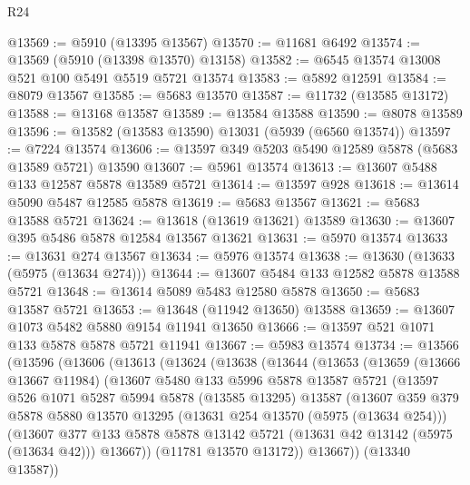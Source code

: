 \begin{lexlean}{R24}
\begin{coremodule}
@13569 := @5910 (@13395 @13567)
@13570 := @11681 @6492
@13574 := @13569 (@5910 (@13398 @13570) @13158)
@13582 := @6545 @13574 @13008 @521 @100 @5491 @5519 @5721 @13574
@13583 := @5892 @12591
@13584 := @8079 @13567
@13585 := @5683 @13570
@13587 := @11732 (@13585 @13172)
@13588 := @13168 @13587
@13589 := @13584 @13588
@13590 := @8078 @13589
@13596 := @13582 (@13583 @13590) @13031 (@5939 (@6560 @13574))
@13597 := @7224 @13574
@13606 := @13597 @349 @5203 @5490 @12589 @5878 (@5683 @13589 @5721) @13590
@13607 := @5961 @13574
@13613 := @13607 @5488 @133 @12587 @5878 @13589 @5721
@13614 := @13597 @928
@13618 := @13614 @5090 @5487 @12585 @5878
@13619 := @5683 @13567
@13621 := @5683 @13588 @5721
@13624 := @13618 (@13619 @13621) @13589
@13630 := @13607 @395 @5486 @5878 @12584 @13567 @13621
@13631 := @5970 @13574
@13633 := @13631 @274 @13567
@13634 := @5976 @13574
@13638 := @13630 (@13633 (@5975 (@13634 @274)))
@13644 := @13607 @5484 @133 @12582 @5878 @13588 @5721
@13648 := @13614 @5089 @5483 @12580 @5878
@13650 := @5683 @13587 @5721
@13653 := @13648 (@11942 @13650) @13588
@13659 := @13607 @1073 @5482 @5880 @9154 @11941 @13650
@13666 := @13597 @521 @1071 @133 @5878 @5878 @5721 @11941
@13667 := @5983 @13574
@13734 := @13566
    (@13596
      (@13606
        (@13613
          (@13624
            (@13638
              (@13644
                (@13653
                  (@13659
                    (@13666 @13667 @11984)
                    (@13607
                      @5480
                      @133
                      @5996
                      @5878
                      @13587
                      @5721
                      (@13597
                        @526
                        @1071
                        @5287
                        @5994
                        @5878
                        (@13585 @13295)
                        @13587
                        (@13607
                          @359
                          @379
                          @5878
                          @5880
                          @13570
                          @13295
                          (@13631 @254 @13570 (@5975 (@13634 @254)))
                          (@13607
                            @377
                            @133
                            @5878
                            @5878
                            @13142
                            @5721
                            (@13631 @42 @13142 (@5975 (@13634 @42)))
                            @13667))
                        (@11781 @13570 @13172))
                      @13667))
                  (@13340 @13587))

\end{coremodule}
\end{lexlean}
